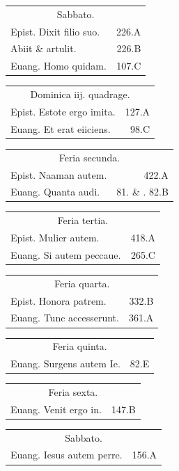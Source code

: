 \documentclass[a5paper,10pt]{book}
\begin{document}
\begin{multicols}{2}
\begin{tabular}{l r}
\multicolumn{2}{c}{\color{red} Sabbato.}\\
Epist. Dixit filio suo. & 226.A\\
Abiit \& artulit. & 226.B\\
Euang. Homo quidam. & 107.C\\
\end{tabular}
\begin{tabular}{l r}
\multicolumn{2}{c}{\color{red} Dominica iij. quadrage.}\\
Epist. Estote ergo imita. & 127.A\\
Euang. Et erat eiiciens. & 98.C\\
\end{tabular}
\begin{tabular}{l r}
\multicolumn{2}{c}{\color{red} Feria secunda.}\\
Epist. Naaman autem. & 422.A\\
Euang. Quanta audi. & 81. \& . 82.B\\
\end{tabular}
\begin{tabular}{l r}
\multicolumn{2}{c}{\color{red} Feria tertia.}\\
Epist. Mulier autem. & 418.A\\
Euang. Si autem peccaue. & 265.C\\
\end{tabular}
\begin{tabular}{l r}
\multicolumn{2}{c}{\color{red} Feria quarta.}\\
Epist. Honora patrem. & 332.B\\
Euang. Tunc accesserunt. & 361.A\\
\end{tabular}
\begin{tabular}{l r}
\multicolumn{2}{c}{\color{red} Feria quinta.}\\
Euang. Surgens autem Ie. & 82.E\\
\end{tabular}
\begin{tabular}{l r}
\multicolumn{2}{c}{\color{red} Feria sexta.}\\
Euang. Venit ergo in. & 147.B\\
\end{tabular}
\begin{tabular}{l r}
\multicolumn{2}{c}{\color{red} Sabbato.}\\
Euang. Iesus autem perre. & 156.A\\
\end{tabular}

\end{multicols}
\end{document}
